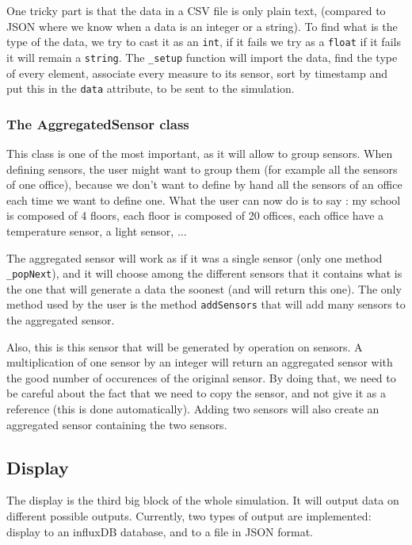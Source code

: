 One tricky part is that the data in a CSV file is only plain text, (compared to JSON where we know when a data is an integer or a string). To find what is the type of the data, we try to cast it as an \verb!int!, if it fails we try as a \verb!float! if it fails it will remain a \verb!string!. The \verb!_setup! function will import the data, find the type of every element, associate every measure to its sensor, sort by timestamp and put this in the \verb!data! attribute, to be sent to the simulation.



\subsubsection{The AggregatedSensor class}

This class is one of the most important, as it will allow to group sensors. When defining sensors, the user might want to group them (for example all the sensors of one office), because we don't want to define by hand all the sensors of an office each time we want to define one. What the user can now do is to say : my school is composed of 4 floors, each floor is composed of 20 offices, each office have a temperature sensor, a light sensor, ...

The aggregated sensor will work as if it was a single sensor (only one method \verb!_popNext!), and it will choose among the different sensors that it contains what is the one that will generate a data the soonest (and will return this one). The only method used by the user is the method \verb!addSensors! that will add many sensors to the aggregated sensor.

Also, this is this sensor that will be generated by operation on sensors. A multiplication of one sensor by an integer will return an aggregated sensor with the good number of occurences of the original sensor. By doing that, we need to be careful about the fact that we need to copy the sensor, and not give it as a reference (this is done automatically). Adding two sensors will also create an aggregated sensor containing the two sensors.


\subsection{Display}

The display is the third big block of the whole simulation. It will output data
on different possible outputs. Currently, two types of output are implemented:
display to an influxDB database, and to a file in JSON format.

